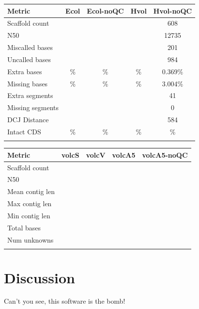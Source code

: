 \documentclass{bioinfo}
\begin{document}
\begin{table}[!t]
{\begin{tabular}{l|cccc}\toprule
Metric            & Ecol & Ecol-noQC & Hvol & Hvol-noQC\\\midrule
Scaffold count    &  &  &  & 608 \\
N50               &  &  &  & 12735   \\
Miscalled bases   &  &  &  & 201 \\
Uncalled bases    &  &  &  & 984 \\
Extra bases       & \% & \% & \% & 0.369\% \\
Missing bases     & \% & \% & \% & 3.004\% \\
Extra segments    &  & & & 41 \\
Missing segments  &  & & & 0 \\
DCJ Distance      &  & & & 584 \\
Intact CDS        & \% & \% & \% & \% \\
\botrule \\
\end{tabular}}{}
\end{table}


\begin{table}[!t]
{\begin{tabular}{l|cccc}\toprule
Metric           &  volcS & volcV & volcA5 & volcA5-noQC\\\midrule
Scaffold count   & & & & \\
N50              & & & & \\
Mean contig len  & & & & \\
Max contig len   & & & & \\
Min contig len   & & & & \\
Total bases      & & & & \\
Num unknowns      & & & & \\
\botrule \\
\end{tabular}}{}
\end{table}

\section{Discussion}

Can't you see, this software is the bomb!
\end{document}
